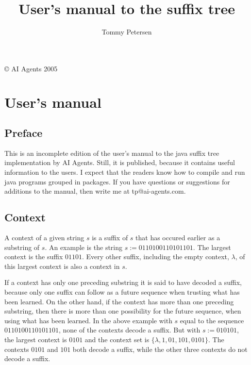 \documentclass[a4paper,11pt]{report}
\author{Tommy Petersen}
\title{User's manual to the suffix tree}
\begin{document}
\maketitle

\newcommand{\R}{\mathbb{R}}
\newcommand{\Q}{\mathbb{Q}}
\newcommand{\Z}{\mathbb{Z}}
\newcommand{\N}{\mathbb{N}}

\newtheorem{lemma}{Lemma}[section]
\newtheorem{proposition}{Proposition}[section]
\newtheorem{theorem}{Theorem}[section]
\newtheorem{corollary}{Corollary}[section]
\newtheorem{algorithm}{Algorithm}[section]
\newtheorem{definition}{Definition}[section]
\newtheorem{example}{Example}[section]

\copyright{ AI Agents 2005}

\tableofcontents

\chapter{User's manual}
\section{Preface}
This is an incomplete edition of the user's manual to the java suffix tree implementation
by AI Agents. Still, it is published, because it contains useful information to the users.
I expect that the readers know how to compile and run java programs grouped in packages.
If you have questions or suggestions for additions to the manual, then write me at tp@ai-agents.com.

\section{Context}
A context of a given string $s$ is a suffix of $s$ that has occured earlier as a substring of $s$.
An example is the string $s := 0110100110101101$. The largest context is the suffix $01101$.
Every other suffix, including the empty context, $\lambda$, of this largest context is also a context
in $s$.

If a context has only one preceding substring it is said to have decoded a suffix, because only one
suffix can follow as a future sequence when trusting what has been learned. On the other hand, if
the context has more than one preceding substring, then there is more than one possibility for the
future sequence, when using what has been learned. In the above example with $s$ equal to the sequence
$0110100110101101$, none of the contexts decode a suffix. But with $s := 010101$, the largest context
is $0101$ and the context set is $\{\lambda, 1, 01, 101, 0101\}$. The contexts $0101$ and $101$ both
decode a suffix, while the other three contexts do not decode a suffix.
\end{document}
